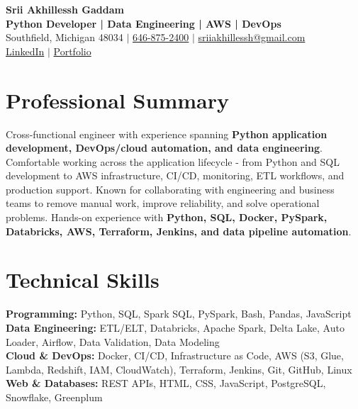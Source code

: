 \documentclass[letterpaper,10pt]{article}
\begin{document}
\fontsize{9.35pt}{10.45pt}\selectfont

\begin{center}
    {\LARGE \textbf{Srii Akhillessh Gaddam}} \\[-1pt]
    \textbf{Python Developer | Data Engineering | AWS | DevOps} \\[2pt]
    Southfield, Michigan 48034 $|$
    \href{tel:6468752400}{646-875-2400} $|$
    \href{mailto:sriiakhillessh@gmail.com}{sriiakhillessh@gmail.com} \\[1pt]
    \href{https://www.linkedin.com/in/srii-akhiilessh-gaddam-b48668191/}{LinkedIn} $|$
    \href{https://sriiakhillesshg.github.io/portfolio/}{Portfolio}
\end{center}
\vspace{-8pt}

\section{Professional Summary}
\small{Cross-functional engineer with experience spanning \textbf{Python application development, DevOps/cloud automation, and data engineering}. Comfortable working across the application lifecycle - from Python and SQL development to AWS infrastructure, CI/CD, monitoring, ETL workflows, and production support. Known for collaborating with engineering and business teams to remove manual work, improve reliability, and solve operational problems. Hands-on experience with \textbf{Python, SQL, Docker, PySpark, Databricks, AWS, Terraform, Jenkins, and data pipeline automation}.}

\section{Technical Skills}
\small{
\textbf{Programming:} Python, SQL, Spark SQL, PySpark, Bash, Pandas, JavaScript \\
\textbf{Data Engineering:} ETL/ELT, Databricks, Apache Spark, Delta Lake, Auto Loader, Airflow, Data Validation, Data Modeling \\
\textbf{Cloud \& DevOps:} Docker, CI/CD, Infrastructure as Code, AWS (S3, Glue, Lambda, Redshift, IAM, CloudWatch), Terraform, Jenkins, Git, GitHub, Linux \\
\textbf{Web \& Databases:} REST APIs, HTML, CSS, JavaScript, PostgreSQL, Snowflake, Greenplum
}
\end{document}

